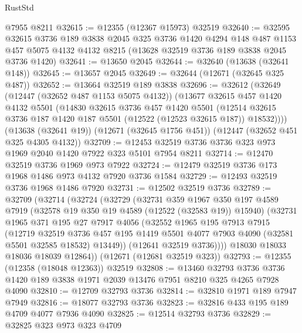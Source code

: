 \begin{lexlean}{RustStd}
\begin{coremodule}
    @7955
    @8211
@32615 := @12355 (@12367 @15973) @32519
@32640 := @32595
    @32615
    @3736
    @189
    @3838
    @2045
    @325
    @3736
    @1420
    @4294
    @148
    @487
    @1153
    @457
    @5075
    @4132
    @4132
    @8215
    (@13628 @32519 @3736 @189 @3838 @2045 @3736 @1420)
@32641 := @13650 @2045
@32644 := @32640 (@13638 (@32641 @148))
@32645 := @13657 @2045
@32649 := @32644 (@12671 (@32645 @325 @487))
@32652 := @13664 @32519 @189 @3838
@32696 := @32612
    (@32649
      (@12447 (@32652 @487 @1153 @5075 @4132))
      (@13677
        @32615
        @457
        @1420
        @4132
        @5501
        (@14830
          @32615
          @3736
          @457
          @1420
          @5501
          (@12514 @32615 @3736 @187 @1420 @187 @5501 (@12522 (@12523 @32615 @187)) @18532))))
    (@13638 (@32641 @19))
    (@12671 (@32645 @1756 @451))
    (@12447 (@32652 @451 @325 @4305 @4132))
@32709 := @12453 @32519 @3736 @3736 @323 @973 @1969 @2040 @1420 @7922 @323 @5101 @7954 @8211
@32714 := @12470 @32519 @3736 @1969 @973 @7922
@32724 := @12479 @32519 @3736 @173 @1968 @1486 @973 @4132 @7920 @3736 @1584
@32729 := @12493 @32519 @3736 @1968 @1486 @7920
@32731 := @12502 @32519 @3736
@32789 := @32709
    (@32714
      (@32724
        (@32729
          (@32731
            @359
            @1967
            @350
            @197
            @4589
            @7919
            (@32578 @19 @350 @19 @4589 (@12522 (@32583 @19)) @15940)
            (@32731
              @1965
              @371
              @195
              @27
              @7917
              @4056
              (@32552
                @1965
                @195
                @7913
                @7915
                (@12719
                  @32519
                  @3736
                  @457
                  @195
                  @1419
                  @5501
                  @4077
                  @7903
                  @4090
                  (@32581 @5501 @32585 @18532)
                  @13449))
              (@12641 @32519 @3736))))
        @18030
        @18033
        @18036
        @18039
        @12864))
    (@12671 (@12681 @32519 @323))
@32793 := @12355 (@12358 (@18048 @12363)) @32519
@32808 := @13460
    @32793
    @3736
    @3736
    @1420
    @189
    @3838
    @1971
    @2039
    @13476
    @7951
    @8210
    @325
    @4265
    @7928
    @4090
@32810 := @12709 @32793 @3736
@32814 := @32810 @1971 @189 @7947 @7949
@32816 := @18077 @32793 @3736
@32823 := @32816 @433 @195 @189 @4709 @4077 @7936 @4090
@32825 := @12514 @32793 @3736
@32829 := @32825 @323 @973 @323 @4709

\end{coremodule}
\end{lexlean}
